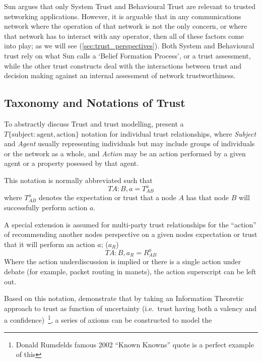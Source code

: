 Sun argues that only System Trust and Behavioural Trust are relevant to trusted networking applications.
However, it is arguable that in any communications network where the operation of that network is not the only concern, or where that network has to interact with any operator, then all of these factors come into play; as we will see (\autoref{sec:trust_perspectives}).
Both System and Behavioural trust rely on what Sun calls a ‘Belief Formation Process’, or a trust assessment, while the other trust constructs deal with the interactions between trust and decision making against an internal assessment of network trustworthiness.



\subsection{Taxonomy and Notations of Trust}\label{sec:trust_taxonomy}

To abstractly discuss Trust and trust modelling, \citet{Liu2006} present a $T\{\text{subject}:\text{agent},\text{action}\}$ notation for individual trust relationships, where \emph{Subject} and \emph{Agent} usually representing individuals but may include groups of individuals or the network as a whole, and \emph{Action} may be an action performed by a given agent or a property posessed by that agent.

This notation is normally abbreviated such that 
\begin{equation}
  \label{eq:trust_notation}
  T{A:B,a} = T^a_{AB}
\end{equation} 
where $T^a_{AB}$ denotes the expectation or trust that a node $A$ has that node $B$ will successfully perform action $a$.

A special extension is assumed for multi-party trust relationships for the ``action'' of recommending another nodes perspective on a given nodes expectation or trust that it will perform an action $a$; ($a_R$)
%
\begin{equation}
  \label{eq:recommendation_notation}
  T{A:B,a_R} = R^a_{AB}
\end{equation}
%
Where the action underdiscussion is implied or there is a single action under debate (for example, packet routing in \glspl{manet}), the action superscript can be left out.

Based on this notation, \citet{Sun2008} demonstrate that by taking an Information Theoretic approach to trust as function of uncertainty (i.e.\ trust having both a valency and a confidence)~\footnote{Donald Rumsfelds famous 2002 ``Known Knowns'' quote is a perfect example of this}, a series of axioms can be constructed to model the 

